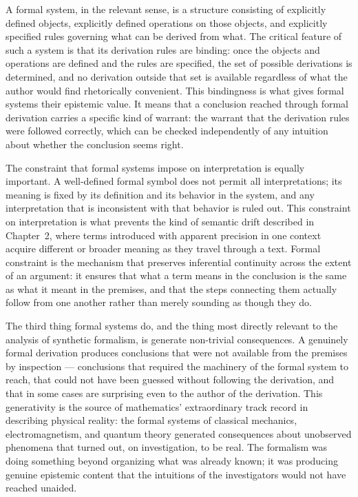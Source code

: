 \documentclass[12pt, openright, twoside]{book}
\begin{document}
A formal system, in the relevant sense, is a structure consisting
of explicitly defined objects, explicitly defined operations on those
objects, and explicitly specified rules governing what can be derived
from what. The critical feature of such a system is that its derivation
rules are binding: once the objects and operations are defined and the
rules are specified, the set of possible derivations is determined,
and no derivation outside that set is available regardless of what
the author would find rhetorically convenient. This bindingness is
what gives formal systems their epistemic value. It means that a
conclusion reached through formal derivation carries a specific kind
of warrant: the warrant that the derivation rules were followed
correctly, which can be checked independently of any intuition about
whether the conclusion seems right.

The constraint that formal systems impose on interpretation is equally
important. A well-defined formal symbol does not permit all
interpretations; its meaning is fixed by its definition and its
behavior in the system, and any interpretation that is inconsistent
with that behavior is ruled out. This constraint on interpretation
is what prevents the kind of semantic drift described in Chapter~2,
where terms introduced with apparent precision in one context acquire
different or broader meaning as they travel through a text. Formal
constraint is the mechanism that preserves inferential continuity
across the extent of an argument: it ensures that what a term means
in the conclusion is the same as what it meant in the premises, and
that the steps connecting them actually follow from one another rather
than merely sounding as though they do.

The third thing formal systems do, and the thing most directly relevant
to the analysis of synthetic formalism, is generate non-trivial
consequences. A genuinely formal derivation produces conclusions
that were not available from the premises by inspection --- conclusions
that required the machinery of the formal system to reach, that could
not have been guessed without following the derivation, and that in
some cases are surprising even to the author of the derivation. This
generativity is the source of mathematics' extraordinary track record
in describing physical reality: the formal systems of classical
mechanics, electromagnetism, and quantum theory generated consequences
about unobserved phenomena that turned out, on investigation, to be
real. The formalism was doing something beyond organizing what was
already known; it was producing genuine epistemic content that the
intuitions of the investigators would not have reached unaided.
\end{document}
